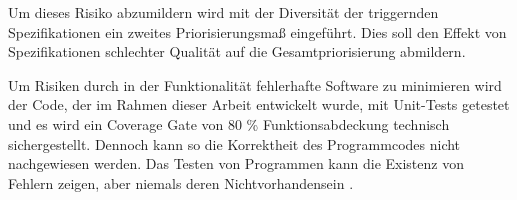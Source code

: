 Um dieses Risiko abzumildern wird mit der Diversität der triggernden Spezifikationen ein zweites Priorisierungsmaß eingeführt. Dies soll den Effekt von Spezifikationen schlechter Qualität auf die Gesamtpriorisierung abmildern.

Um Risiken durch in der Funktionalität fehlerhafte Software zu minimieren wird der Code, der im Rahmen dieser Arbeit entwickelt wurde, mit Unit-Tests getestet und es wird ein Coverage Gate von 80 \% Funktionsabdeckung technisch sichergestellt. Dennoch kann so die Korrektheit des Programmcodes nicht nachgewiesen werden. \glqq Das Testen von Programmen kann die Existenz von Fehlern zeigen, aber niemals deren Nichtvorhandensein\grqq{} \parencite{dijkstra_notes_1970}.